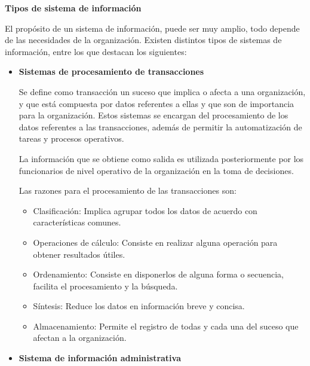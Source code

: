 \vspace{1\baselineskip}
\textbf{ Tipos de sistema de información}

El propósito de un sistema de información, puede ser muy amplio, todo depende
de las necesidades de la organización. Existen distintos tipos de sistemas de
información, entre los que destacan los siguientes\cite{kendall2005analisis}:

\setcounter{secnumdepth}{3}
\begin{itemize}

  \item \textbf{Sistemas de procesamiento de transacciones}

        Se define como transacción un suceso que implica o afecta a una organización, y
        que está compuesta por datos referentes a ellas y que son de importancia para
        la organización\cite{kendall2005analisis}. Estos sistemas se encargan del
        procesamiento de los datos referentes a las transacciones, además de permitir
        la automatización de tareas y procesos operativos.

        \vspace{1\baselineskip}
        La información que se obtiene como salida es utilizada posteriormente por los
        funcionarios de nivel operativo de la organización en la toma de decisiones.

        Las razones para el procesamiento de las transacciones son:

        \begin{itemize}
          \item Clasificación: Implica agrupar todos los datos de acuerdo con características
                comunes.
          \item Operaciones de cálculo: Consiste en realizar alguna operación para obtener
                resultados útiles.
          \item Ordenamiento: Consiste en disponerlos de alguna forma o secuencia, facilita el
                procesamiento y la búsqueda.
          \item Síntesis: Reduce los datos en información breve y concisa.
          \item Almacenamiento: Permite el registro de todas y cada una del suceso que afectan
                a la organización.

        \end{itemize}

  \item \textbf{Sistema de información administrativa}


\end{itemize}
